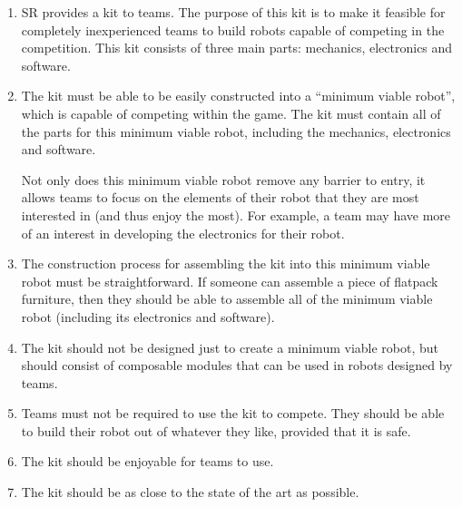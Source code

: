\begin{draft}
\begin{enumerate}
\begin{enumerate}
    \item SR provides a kit to teams.  The purpose of this kit is to make it feasible for completely inexperienced teams to build robots capable of competing in the competition.  This kit consists of three main parts: mechanics, electronics and software.

    \item The kit must be able to be easily constructed into a ``minimum viable robot'', which is capable of competing within the game.  The kit must contain all of the parts for this minimum viable robot, including the mechanics, electronics and software.

Not only does this minimum viable robot remove any barrier to entry, it allows teams to focus on the elements of their robot that they are most interested in (and thus enjoy the most).  For example, a team may have more of an interest in developing the electronics for their robot.
      
    \item The construction process for assembling the kit into this minimum viable robot must be straightforward.  If someone can assemble a piece of flatpack furniture, then they should be able to assemble all of the minimum viable robot (including its electronics and software).

    \item The kit should not be designed just to create a minimum viable robot, but should consist of composable modules that can be used in robots designed by teams.  

    \item Teams must not be required to use the kit to compete.  They should be able to build their robot out of whatever they like, provided that it is safe.

    \item The kit should be enjoyable for teams to use.

    \item The kit should be as close to the state of the art as possible.


\end{enumerate}
\end{enumerate}
\end{draft}

